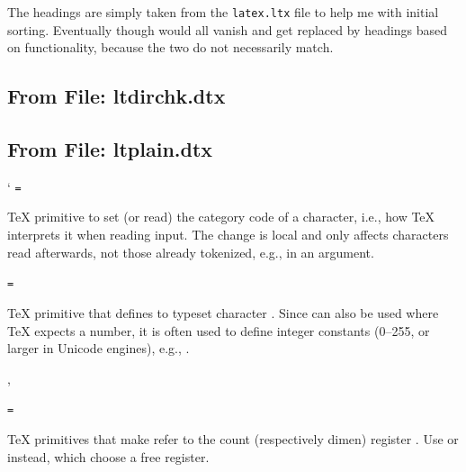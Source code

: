 \documentclass{l3in2edoc}
\begin{document}
The headings are simply taken from the \texttt{latex.ltx} file to help
me with initial sorting. Eventually though would all vanish and get
replaced by headings based on functionality, because the two do
not necessarily match.


\subsection{From File: ltdirchk.dtx}

\leavevmode


\subsection{From File: ltplain.dtx}

\begin{function}[]
  {
    \catcode
  }
  \begin{syntax}
     ` \texttt{=} 
  \end{syntax}
  \TeX{} primitive to set (or read) the category code of a character,
  i.e., how \TeX{} interprets it when reading input. The change is
  local and only affects characters read afterwards, not those already
  tokenized, e.g., in an argument.
\end{function}

\begin{function}[]
  {
    \chardef
  }
  \begin{syntax}
      \texttt{=} 
  \end{syntax}
  \TeX{} primitive that defines  to typeset character
  . Since  can also be used where \TeX{}
  expects a number, it is often used to define integer constants
  (0--255, or larger in Unicode engines), e.g., .
\end{function}


\begin{function}[]
  {
    \countdef,
    \dimendef
  }
  \begin{syntax}
      \texttt{=} 
  \end{syntax}
  \TeX{} primitives that make  refer to the count
  (respectively dimen) register . Use  or
   instead, which choose a free register.
\end{function}
\end{document}
